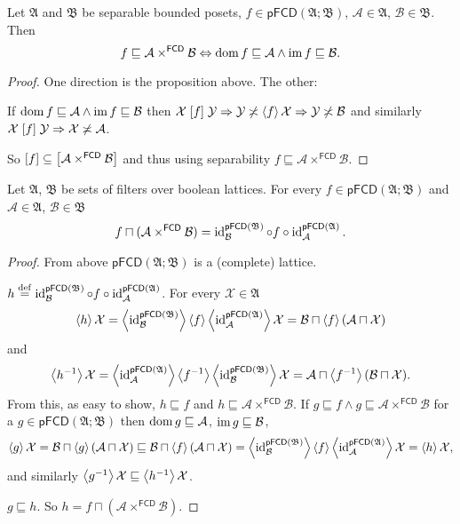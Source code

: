 \begin{thm}
Let $\mathfrak{A}$ and $\mathfrak{B}$ be separable bounded posets,
$f\in\mathsf{pFCD}(\mathfrak{A};\mathfrak{B})$, $\mathcal{A}\in\mathfrak{A}$,
$\mathcal{B}\in\mathfrak{B}$. Then
\[
f\sqsubseteq\mathcal{A}\times^{\mathsf{FCD}}\mathcal{B}\Leftrightarrow\operatorname{dom} f\sqsubseteq\mathcal{A}\wedge\operatorname{im} f\sqsubseteq\mathcal{B}.
\]
\end{thm}
\begin{proof}
One direction is the proposition above. The other:

If $\operatorname{dom} f\sqsubseteq\mathcal{A}\wedge\operatorname{im} f\sqsubseteq\mathcal{B}$
then $\mathcal{X}\mathrel{\left[f\right]}\mathcal{Y}\Rightarrow\mathcal{Y}\not\asymp\left\langle f\right\rangle\mathcal{X}\Rightarrow\mathcal{Y}\not\asymp\mathcal{B}$
and similarly $\mathcal{X}\mathrel{\left[f\right]}\mathcal{Y}\Rightarrow\mathcal{X}\not\asymp\mathcal{A}$.

So $\mathord{\mathrel{\left[f\right]}}\subseteq\mathord{\mathrel{\left[\mathcal{A}\times^{\mathsf{FCD}}\mathcal{B}\right]}}$
and thus using separability $f\sqsubseteq\mathcal{A}\times^{\mathsf{FCD}}\mathcal{B}$.\end{proof}
\begin{thm}
Let $\mathfrak{A}$, $\mathfrak{B}$ be sets of filters over boolean
lattices. For every $f\in\mathsf{pFCD}(\mathfrak{A};\mathfrak{B})$
and $\mathcal{A}\in\mathfrak{A}$, $\mathcal{B}\in\mathfrak{B}$ 
\[
f\sqcap(\mathcal{A}\times^{\mathsf{FCD}}\mathcal{B})=\operatorname{id}_{\mathcal{B}}^{\mathsf{pFCD}(\mathfrak{B})}\circ f\circ\operatorname{id}_{\mathcal{A}}^{\mathsf{pFCD}(\mathfrak{A})}.
\]
\end{thm}
\begin{proof}
From above $\mathsf{pFCD}(\mathfrak{A};\mathfrak{B})$ is a (complete)
lattice.

$h\overset{\mathrm{def}}{=}\operatorname{id}_{\mathcal{B}}^{\mathsf{pFCD}(\mathfrak{B})}\circ f\circ\operatorname{id}_{\mathcal{A}}^{\mathsf{pFCD}(\mathfrak{A})}$.
For every $\mathcal{X}\in\mathfrak{A}$
\[
\left\langle h\right\rangle\mathcal{X}=\left\langle \operatorname{id}_{\mathcal{B}}^{\mathsf{pFCD}(\mathfrak{B})}\right\rangle\left\langle f\right\rangle\left\langle \operatorname{id}_{\mathcal{A}}^{\mathsf{pFCD}(\mathfrak{A})}\right\rangle\mathcal{X}=\mathcal{B}\sqcap\left\langle f\right\rangle(\mathcal{A}\sqcap\mathcal{X})
\]
and
\[
\left\langle h^{-1}\right\rangle\mathcal{X}=\left\langle \operatorname{id}_{\mathcal{A}}^{\mathsf{pFCD}(\mathfrak{A})}\right\rangle\left\langle f^{-1}\right\rangle\left\langle \operatorname{id}_{\mathcal{B}}^{\mathsf{pFCD}(\mathfrak{B})}\right\rangle\mathcal{X}=\mathcal{A}\sqcap\left\langle f^{-1}\right\rangle(\mathcal{B}\sqcap\mathcal{X}).
\]
From this, as easy to show, $h\sqsubseteq f$ and $h\sqsubseteq\mathcal{A}\times^{\mathsf{FCD}}\mathcal{B}$.
If $g\sqsubseteq f\wedge g\sqsubseteq\mathcal{A}\times^{\mathsf{FCD}}\mathcal{B}$
for a $g\in\mathsf{pFCD}(\mathfrak{A};\mathfrak{B})$ then $\operatorname{dom} g\sqsubseteq\mathcal{A}$,
$\operatorname{im} g\sqsubseteq\mathcal{B}$,
\[
\left\langle g\right\rangle\mathcal{X}=\mathcal{B}\sqcap\left\langle g\right\rangle(\mathcal{A}\sqcap\mathcal{X})\sqsubseteq\mathcal{B}\sqcap\left\langle f\right\rangle(\mathcal{A}\sqcap\mathcal{X})=\left\langle \operatorname{id}_{\mathcal{B}}^{\mathsf{pFCD}(\mathfrak{B})}\right\rangle\left\langle f\right\rangle\left\langle \operatorname{id}_{\mathcal{A}}^{\mathsf{pFCD}(\mathfrak{A})}\right\rangle\mathcal{X}=\left\langle h\right\rangle\mathcal{X},
\]
and similarly $\left\langle g^{-1}\right\rangle\mathcal{X}\sqsubseteq\left\langle h^{-1}\right\rangle\mathcal{X}$.

$g\sqsubseteq h$. So $h=f\sqcap(\mathcal{A}\times^{\mathsf{FCD}}\mathcal{B})$.\end{proof}
